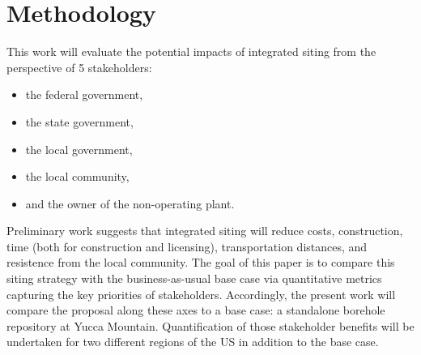 \section{Methodology}

This work will evaluate the potential impacts of integrated siting from the 
perspective of 5 stakeholders:
\begin{itemize}
        \item the federal government,
        \item the state government,
        \item the local government,
        \item the local community,
        \item and the owner of the non-operating plant.
\end{itemize}


Preliminary work \cite{waleed_regional_2015} suggests that integrated siting 
will reduce costs, construction, time (both for construction and licensing), 
transportation distances, and resistence from the local community.  
The goal of this paper is to compare this siting strategy with the 
business-as-usual base case via quantitative metrics capturing the key 
priorities of stakeholders. Accordingly, the present 
work will compare the proposal along these axes to a base case: a standalone 
borehole repository at Yucca Mountain.  
Quantification of those stakeholder 
benefits will be undertaken for two different regions of the US in addition to 
the base case.  




